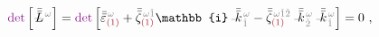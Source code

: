 \begin{subequations}
\begin{align}
	\textcolor{Plum}{\det} \left[ \Xint{\mathcolor{gray}{-}}{32}{\bar{\bar{L}}}^{\;\! \mathcolor{gray}{\omega}} \right] = \textcolor{Plum}{\det} \left[ \bar{\bar{\varepsilon}}^{\;\! \mathcolor{gray}{\omega}}_{\textcolor{Maroon}{(1)}} + \bar{\bar{\zeta}}^{\;\! \mathcolor{gray}{\omega} \mathcolor{gray}{\check{1}}}_{\textcolor{Maroon}{(1)}} \mathbb{i} \Xint{\begin{smallmatrix} ~ \\ {}^{}_{\mathcolor{gray}{-}} \\ ~ \end{smallmatrix}}{15}{\bar{\bar{k}}}_{\;\! \mathcolor{gray}{\check{1}}}^{\;\! \mathcolor{gray}{\omega}} - \bar{\bar{\zeta}}^{\;\! \mathcolor{gray}{\omega} \mathcolor{gray}{\check{1} \check{2}}}_{\textcolor{Maroon}{(1)}} \Xint{\begin{smallmatrix} ~ \\ {}^{}_{\mathcolor{gray}{-}} \\ ~ \end{smallmatrix}}{15}{\bar{\bar{k}}}_{\;\! \mathcolor{gray}{\check{2}}}^{\;\! \mathcolor{gray}{\omega}} \Xint{\begin{smallmatrix} ~ \\ {}^{}_{\mathcolor{gray}{-}} \\ ~ \end{smallmatrix}}{15}{\bar{\bar{k}}}_{\;\! \mathcolor{gray}{\check{1}}}^{\;\! \mathcolor{gray}{\omega}} \right] &= 0 ~, \label{eq:nonlinear(2)-wave_wkrho-simplify6-L3}
\end{align}
\end{subequations}
